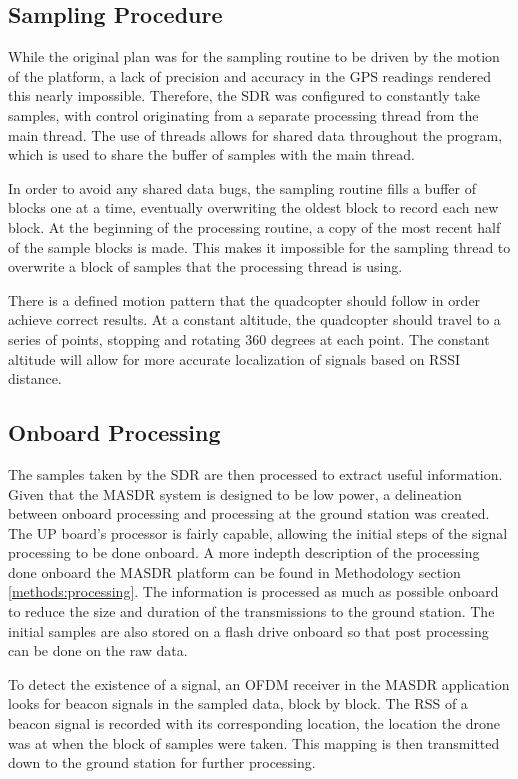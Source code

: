 \subsection{Sampling Procedure} \label{impl:rotate}
While the original plan was for the sampling routine to be driven by the motion of the platform, a lack of precision and accuracy in the GPS readings rendered this nearly impossible. Therefore, the SDR was configured to constantly take samples, with control originating from a separate processing thread from the main thread. The use of threads allows for shared data throughout the program, which is used to share the  buffer of samples with the main thread. \par
In order to avoid any shared data bugs, the sampling routine fills a buffer of blocks one at a time, eventually overwriting the oldest block to record each new block. At the beginning of the processing routine, a copy of the most recent half of the sample blocks is made. This makes it impossible for the sampling thread to overwrite a block of samples that the processing thread is using. \par
There is a defined motion pattern that the quadcopter should follow in order achieve correct results. At a constant altitude, the quadcopter should travel to a series of points, stopping and rotating 360 degrees at each point. The constant altitude will allow for more accurate localization of signals based on RSSI distance.
\subsection{Onboard Processing}
The samples taken by the SDR are then processed to extract useful information. Given that the MASDR system is designed to be low power, a delineation between onboard processing and processing at the ground station was created. The UP board’s processor is fairly capable, allowing the initial steps of the signal processing to be done onboard. A more indepth description of the processing done onboard the MASDR platform can be found in Methodology section \ref{methods:processing}. The information is processed as much as possible onboard to reduce the size and duration of the transmissions to the ground station. The initial samples are also stored on a flash drive onboard so that post processing can be done on the raw data. \par
To detect the existence of a signal, an OFDM receiver in the MASDR application looks for beacon signals in the sampled data, block by block. The RSS of a beacon signal is recorded with its corresponding location, the location the drone was at when the block of samples were taken. This mapping is then transmitted down to the ground station for further processing.
